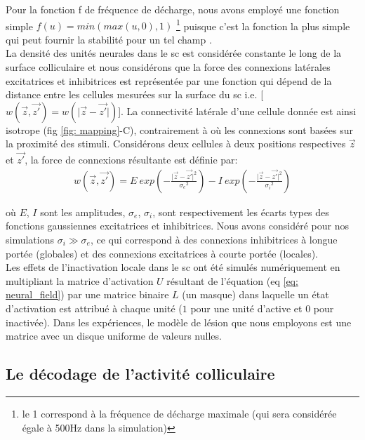 Pour la fonction f de fréquence de décharge, nous avons employé une fonction simple $f(u)=min(max(u, 0), 1)$ \footnote{le 1 correspond à la fréquence de décharge maximale (qui sera considérée égale à 500Hz dans la simulation) } puisque c'est la fonction la plus simple qui peut fournir la stabilité pour un tel champ \cite{Salinas:1996}.\\

La densité des unités neurales dans le \gls{sc} est considérée constante le long de la surface colliculaire et nous considérons que la force des connexions latérales excitatrices et inhibitrices est représentée par une fonction qui dépend de la distance entre les cellules mesurées sur la surface du \gls{sc} i.e. [$ w(\vec{z},\vec{z'})=w(\vert \vec{z}-\vec{z'} \vert)$]. La connectivité latérale d'une cellule donnée est ainsi isotrope (fig \ref{fig: mapping}-C), contrairement à \cite{Nakahara:2006} où les connexions sont basées sur la proximité des stimuli. Considérons deux cellules à deux positions respectives $\vec{z}$ et $\vec{z'}$, la force de connexions résultante est définie par:\\

\begin{align}
w(\vec{z},\vec{z'})=E~exp\left(-\frac{\vert \vec{z}-\vec{z'} \vert^2}{{\sigma_e}^2}\right) -
  I~exp\left(-\frac{\vert \vec{z}-\vec{z'} \vert^2}{{\sigma_i}^2}\right)
  \label{eq: weight}
\end{align}

o\`u $E$, $I$ sont les amplitudes, $\sigma_e$, $\sigma_i$, sont respectivement les écarts types des fonctions gaussiennes excitatrices et inhibitrices. Nous avons considéré pour nos simulations $\sigma_i \gg \sigma_e$, ce qui correspond à des connexions inhibitrices à longue portée (globales) et des connexions excitatrices à courte portée (locales).\\

Les effets de l'inactivation locale dans le \gls{sc} ont été simulés numériquement en multipliant la matrice d'activation $U$ résultant de l'équation (eq \ref{eq: neural_field}) par une matrice binaire $L$ (un masque) dans laquelle un état d'activation est attribué à chaque unité ($1$ pour une unité d'active et $0$ pour inactivée). Dans les expériences, le modèle de lésion que nous employons est une matrice avec un disque uniforme de valeurs nulles.\\

\subsection{Le d\'ecodage de l'activité colliculaire}

